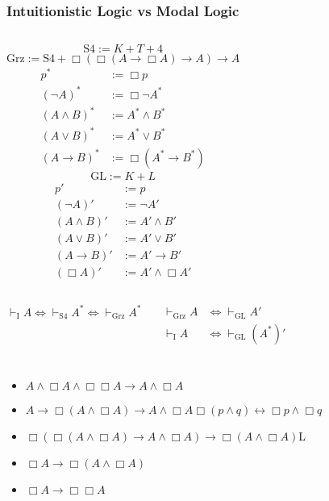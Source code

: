 \documentclass[UTF8,aspectratio=43,11pt,colorlinks,compress,openany]{beamer}%
\begin{document}
\begin{frame}\frametitle{Intuitionistic Logic vs Modal Logic}
\setlength\abovedisplayskip{0pt}
	\begin{columns}
			\[\mathrm{S4}:=K+T+4\]
			\[\mathrm{Grz}:=\mathrm{S4}+\Box(\Box(A\to\Box A)\to A)\to A\]
			\begin{align*}
			p^*&:=\Box p\\
			(\neg A)^*&:=\Box\neg A^*\\
			(A\wedge B)^*&:= A^*\wedge B^*\\
			(A\vee B)^*&:= A^*\vee B^*\\
			(A\to B)^*&:=\Box(A^*\to B^*)
			\end{align*}
			\[\mathrm{GL}:=K+L\]
			\begin{align*}
			p'&:=p\\
			(\neg A)'&:=\neg A'\\
			(A\wedge B)'&:= A'\wedge B'\\
			(A\vee B)'&:= A'\vee B'\\
			(A\to B)'&:= A'\to B'\\
			(\Box A)'&:= A'\wedge\Box A'
			\end{align*}
	\end{columns}
	\begin{columns}
		\column{.5\textwidth}
			\begin{block}{}
				\[\vdash_{\mathrm{I}} A\iff\vdash_{\mathrm{S4}} A^*\iff\vdash_{\mathrm{Grz}} A^*\]
			\end{block}
		\column{.4\textwidth}
			\begin{block}{}
				\begin{align*}
				\vdash_{\mathrm{Grz}} A&\iff\vdash_{\mathrm{GL}} A'\\
				\vdash_{\mathrm{I}} A&\iff\vdash_{\mathrm{GL}}(A^*)'
				\end{align*}
			\end{block}
	\end{columns}
\end{frame}

\begin{frame}\frametitle{}
\centerline{}
\begin{itemize}
	\item $A\wedge\Box A\wedge\Box\Box A\to A\wedge\Box A$
	\item $A\to\Box(A\wedge\Box A)\to A\wedge\Box A$\hfill $\Box(p\wedge q)\leftrightarrow\Box p\wedge\Box q$
	\item $\Box(\Box (A\wedge\Box A)\to A\wedge\Box A)\to\Box(A\wedge\Box A)$\hfill L
	\item $\Box A\to\Box(A\wedge\Box A)$
	\item $\Box A\to\Box\Box A$
\end{itemize}
\end{frame}
\end{document}
